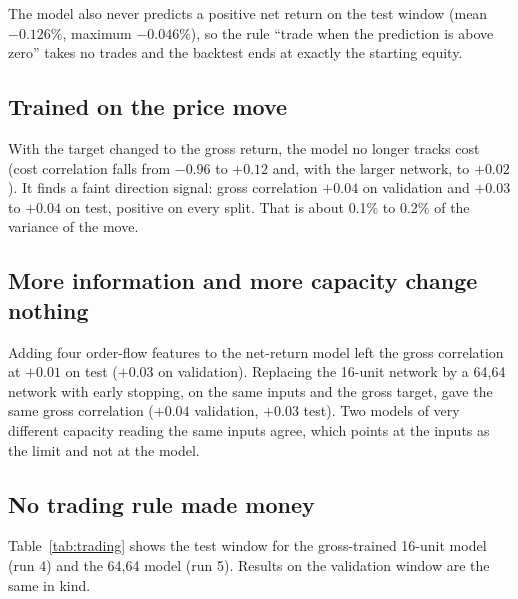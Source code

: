 \documentclass[11pt,a4paper]{article}
\begin{document}
The model also never predicts a positive net return on the test window (mean
$-0.126\%$, maximum $-0.046\%$), so the rule ``trade when the prediction is
above zero'' takes no trades and the backtest ends at exactly the starting
equity.

\subsection{Trained on the price move}

With the target changed to the gross return, the model no longer tracks cost
(cost correlation falls from $-0.96$ to $+0.12$ and, with the larger network,
to $+0.02$). It finds a faint direction signal: gross correlation $+0.04$ on
validation and $+0.03$ to $+0.04$ on test, positive on every split. That is
about 0.1\% to 0.2\% of the variance of the move.

\subsection{More information and more capacity change nothing}

Adding four order-flow features to the net-return model left the gross
correlation at $+0.01$ on test ($+0.03$ on validation). Replacing the 16-unit
network by a 64,64 network with early stopping, on the same inputs and the
gross target, gave the same gross correlation ($+0.04$ validation, $+0.03$
test). Two models of very different capacity reading the same inputs agree,
which points at the inputs as the limit and not at the model.

\subsection{No trading rule made money}

Table~\ref{tab:trading} shows the test window for the gross-trained 16-unit
model (run 4) and the 64,64 model (run 5). Results on the validation window
are the same in kind.
\end{document}
